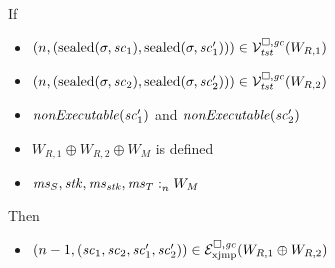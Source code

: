 \begin{lemma}
  \label{lem:sealed-lrv-lrexj}
  If
  \begin{itemize}
  \item $\npair{(\sealed{\sigma,\vsc_1},\sealed{\sigma,\vsc_1'})} \in \lrvg{\trust}(W_{R,1})$
  \item $\npair{(\sealed{\sigma,\vsc_2},\sealed{\sigma,\vsc_2'})} \in \lrvg{\trust}(W_{R,2})$ 
  \item $\nonExec{\vsc_1'}$ and $\nonExec{\vsc_2'}$
  \item $W_{R,1} \oplus W_{R,2} \oplus W_M$ is defined
  \item $\memSat{\ms_S,\stk,\ms_\stk,\ms_T}{W_M}$
  \end{itemize}
  Then
  \begin{itemize}
  \item $\npair[n-1]{(\vsc_1,\vsc_2,\vsc_1',\vsc_2')} \in \lrexj(W_{R,1}\oplus W_{R,2})$
  \end{itemize}
\end{lemma}
